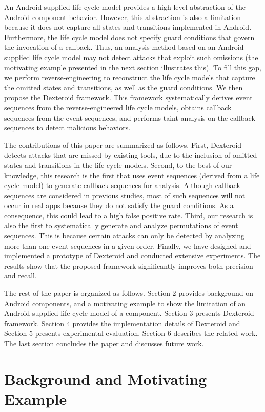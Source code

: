 \documentclass[10pt]{elsarticle}
\begin{document}
An Android-supplied life cycle model provides a high-level abstraction of the Android component behavior. However, this abstraction is also a limitation because it does not capture all states and transitions implemented in Android. Furthermore, the life cycle model does not specify guard conditions that govern the invocation of a callback. Thus, an analysis method based on an Android-supplied life cycle model may not detect attacks that exploit such omissions (the motivating example presented in the next section illustrates this). To fill this gap, we perform reverse-engineering to reconstruct the life cycle models that capture the omitted states and transitions, as well as the guard conditions. We then propose the Dexteroid framework. This framework systematically derives event sequences from the reverse-engineered life cycle models, obtains callback sequences from the event sequences, and performs taint analysis on the callback sequences to detect malicious behaviors.

The contributions of this paper are summarized as follows. First, Dexteroid detects attacks that are missed by existing tools, due to the inclusion of omitted states and transitions in the life cycle models. Second, to the best of our knowledge, this research is the first that uses event sequences (derived from a life cycle model) to generate callback sequences for analysis. Although callback sequences are considered in previous studies, most of such sequences will not occur in real apps because they do not satisfy the guard conditions. As a consequence, this could lead to a high false positive rate. Third, our research is also the first to systematically generate and analyze permutations of event sequences. This is because certain attacks can only be detected by analyzing more than one event sequences in a given order. Finally, we have designed and implemented a prototype of Dexteroid and conducted extensive experiments. The results show that the proposed framework significantly improves both precision and recall.

The rest of the paper is organized as follows. Section 2 provides background on Android components, and a motivating example to show the limitation of an Android-supplied life cycle model of a component. Section 3 presents Dexteroid framework. Section 4 provides the implementation details of Dexteroid and Section 5 presents experimental evaluation. Section 6 describes the related work. The last section concludes the paper and discusses future work. 

\section {Background and Motivating Example}
\end{document}

